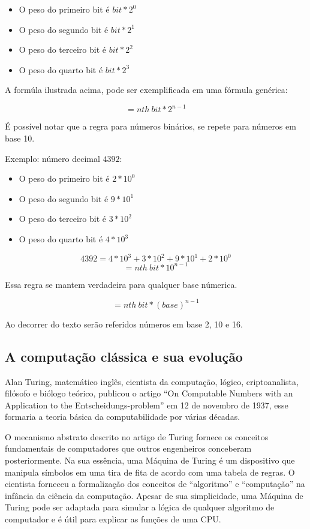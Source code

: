 \begin{itemize}
  \item O peso do primeiro bit é $bit * 2^0$
  \item O peso do segundo bit é $bit * 2^1$
  \item O peso do terceiro bit é $bit * 2^2$
  \item O peso do quarto bit é $bit * 2^3$
\end{itemize}

A formúla ilustrada acima, pode ser exemplificada em uma fórmula genérica: 

\[= nth\: bit * 2^{n-1}\]

É possível notar que a regra para números binários, se repete para números em base 10.

Exemplo: número decimal $4392$:
\begin{itemize}
  \item O peso do primeiro bit é $2 * 10^0$
  \item O peso do segundo bit é $9 * 10^1$
  \item O peso do terceiro bit é $3 * 10^2$
  \item O peso do quarto bit é $4 * 10^3$
\end{itemize}
\[ 4392 = 4*10^3 + 3*10^2 + 9*10^1 + 2*10^0\]
\[= nth\: bit * 10^{n-1}\]

Essa regra se mantem verdadeira para qualquer base númerica.

\[= nth\: bit * (base)^{n-1}\]

Ao decorrer do texto serão referidos números em base 2, 10 e 16. 

\subsection{A computação clássica e sua evolução}
Alan Turing, matemático inglês, cientista da computação, lógico, criptoanalista, filósofo e biólogo teórico, publicou o artigo “On Computable Numbers with an Application to the Entscheidungs-problem” \cite{8} em 12 de novembro de 1937, esse formaria a teoria básica da computabilidade por várias décadas.

O mecanismo abstrato descrito no artigo de Turing fornece os conceitos fundamentais de computadores que outros engenheiros conceberam posteriormente. Na sua essência, uma Máquina de Turing é um dispositivo que manipula símbolos em uma tira de fita de acordo com uma tabela de regras. O cientista forneceu a formalização dos conceitos de “algoritmo” e “computação” na infância da ciência da computação. Apesar de sua simplicidade, uma Máquina de Turing pode ser adaptada para simular a lógica de qualquer algoritmo de computador e é útil para explicar as funções de uma CPU.

